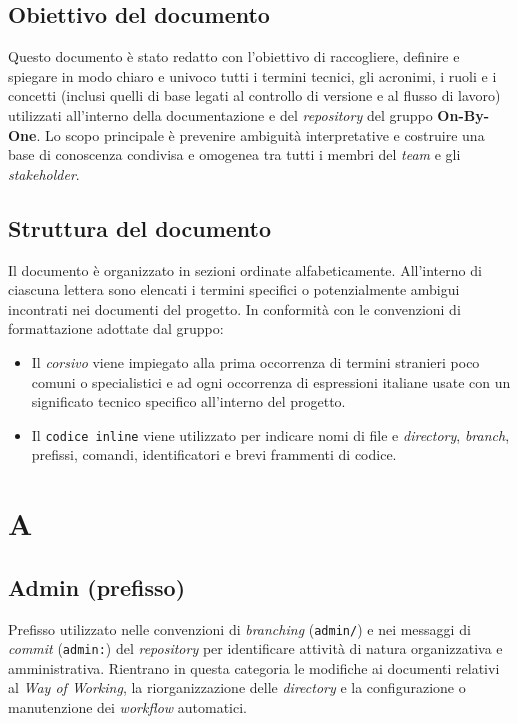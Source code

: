 \documentclass[11pt, a4paper]{article}
\begin{document}
\subsection{Obiettivo del documento}
Questo documento è stato redatto con l'obiettivo di raccogliere, definire e spiegare in modo chiaro e univoco tutti i termini tecnici, gli acronimi, i ruoli e i concetti (inclusi quelli di base legati al controllo di versione e al flusso di lavoro) utilizzati all'interno della documentazione e del \textit{repository} del gruppo \textbf{On-By-One}. Lo scopo principale è prevenire ambiguità interpretative e costruire una base di conoscenza condivisa e omogenea tra tutti i membri del \textit{team} e gli \textit{stakeholder}.

\subsection{Struttura del documento}
Il documento è organizzato in sezioni ordinate alfabeticamente. All'interno di ciascuna lettera sono elencati i termini specifici o potenzialmente ambigui incontrati nei documenti del progetto. In conformità con le convenzioni di formattazione adottate dal gruppo:
\begin{itemize}
    \item Il \textit{corsivo} viene impiegato alla prima occorrenza di termini stranieri poco comuni o specialistici e ad ogni occorrenza di espressioni italiane usate con un significato tecnico specifico all'interno del progetto.
    \item Il \texttt{codice inline} viene utilizzato per indicare nomi di file e \textit{directory}, \textit{branch}, prefissi, comandi, identificatori e brevi frammenti di codice.
\end{itemize}

\newpage


\section*{A}

\subsection*{Admin (prefisso)}
Prefisso utilizzato nelle convenzioni di \textit{branching} (\texttt{admin/}) e nei messaggi di \textit{commit} (\texttt{admin:}) del \textit{repository} per identificare attività di natura organizzativa e amministrativa. Rientrano in questa categoria le modifiche ai documenti relativi al \textit{Way of Working}, la riorganizzazione delle \textit{directory} e la configurazione o manutenzione dei \textit{workflow} automatici.
\end{document}
